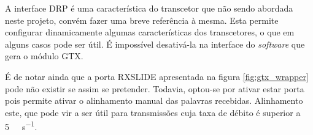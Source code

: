 A interface DRP é uma característica do transcetor que não sendo abordada neste projeto, convém fazer uma breve referência à mesma. Esta permite configurar dinamicamente algumas características dos transcetores, o que em alguns casos pode ser útil. É impossível desativá-la na interface do \textit{software} que gera o módulo GTX.

É de notar ainda que a porta RXSLIDE apresentada na figura \ref{fig:gtx_wrapper} pode não existir se assim se pretender. Todavia, optou-se por ativar estar porta pois permite ativar o alinhamento manual das palavras recebidas. Alinhamento este, que pode vir a ser útil para transmissões cuja taxa de débito é superior a \SI{5}{\giga\bit\per\second}.







%
%
%
%
%
%
%










